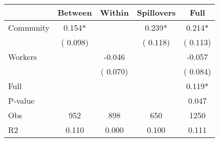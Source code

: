 
\begin{tabular}{l*{4}{c}}\hline&\multicolumn{1}{c}{Between}&\multicolumn{1}{c}{Within}&\multicolumn{1}{c}{Spillovers}&\multicolumn{1}{c}{Full}\\ \hline
 Community             &              0.154*      &                                               &        0.239* &         0.214*                            \\ 
                               &        (       0.098)           &                                       &       (       0.118)     &      (       0.113)                                           \\ 
 Workers       &                                               &       -0.046    &                                &            -0.057                            \\ 
                               &                                               & (       0.070)                  &                                        &      (       0.084)                                           \\ 
\hline                                                                                                                                                                                                                                            
 Full                  &                                               &                                               &                                        &             0.119*                                     \\ 
 P-value               &                                               &                                               &                                        &             0.047                                           \\ 
 Obs                   &               952               &       898                       &       650                &              1250                                               \\ 
 R2                    &                      0.110              &              0.000                      &              0.100               &                     0.111                                              \\ 
\hline \end{tabular}                                                                                                                                                                                                              